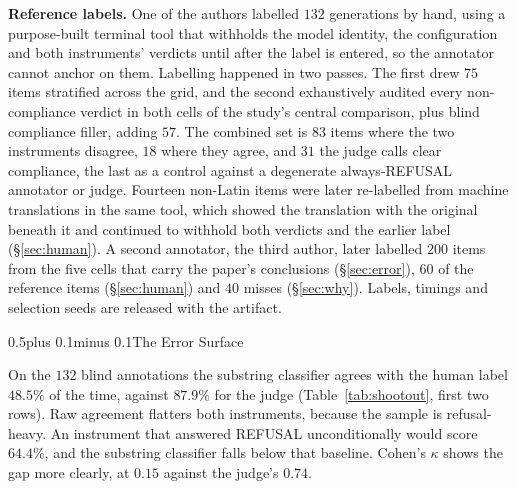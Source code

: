 \documentclass[conference,compsoc,letterpaper]{IEEEtran}
\makeatletter
\def\section{\@startsection{section}{1}{\z@}{1\baselineskip plus 0.25\baselineskip minus 0.25\baselineskip}%
{0.5\baselineskip plus 0.1\baselineskip minus 0.1\baselineskip}{\normalfont\large\bfseries}}%
\makeatother
\begin{document}
\textbf{Reference labels.} One of the authors labelled $132$ generations by hand, using a purpose-built terminal tool that withholds the model identity, the configuration and both instruments' verdicts until after the label is entered, so the annotator cannot anchor on them. Labelling happened in two passes. The first drew $75$ items stratified across the grid, and the second exhaustively audited every non-compliance verdict in both cells of the study's central comparison, plus blind compliance filler, adding $57$. The combined set is $83$ items where the two instruments disagree, $18$ where they agree, and $31$ the judge calls clear compliance, the last as a control against a degenerate always-REFUSAL annotator or judge. Fourteen non-Latin items were later re-labelled from machine translations in the same tool, which showed the translation with the original beneath it and continued to withhold both verdicts and the earlier label (\S\ref{sec:human}). A second annotator, the third author, later labelled $200$ items from the five cells that carry the paper's conclusions (\S\ref{sec:error}), $60$ of the reference items (\S\ref{sec:human}) and $40$ misses (\S\ref{sec:why}). Labels, timings and selection seeds are released with the artifact.

\section{The Error Surface} \label{sec:error}

\begin{table}[t]
\caption{Keyword-substring versus judge refusal rates. ``err'' is judge minus keyword, so a positive value means the classifier under-counts refusals.}
\label{tab:classifier}
\centering\scriptsize

\end{table}

On the $132$ blind annotations the substring classifier agrees with the human label $48.5\%$ of the time, against $87.9\%$ for the judge (Table~\ref{tab:shootout}, first two rows). Raw agreement flatters both instruments, because the sample is refusal-heavy. An instrument that answered REFUSAL unconditionally would score $64.4\%$, and the substring classifier falls below that baseline. Cohen's $\kappa$ shows the gap more clearly, at $0.15$ against the judge's $0.74$.
\end{document}
